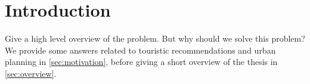 \chapter{Introduction}
\label{ch:introduction}

Give a high level overview of the problem.
But why should we solve this problem? We provide some answers related to touristic
recommendations and urban planning in \autoref{sec:motivation}, before giving
a short overview of the thesis in \autoref{sec:overview}.



% 


